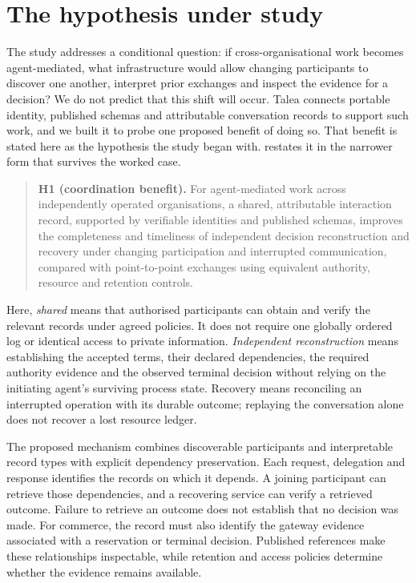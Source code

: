 \section{The hypothesis under study}
\label{sec:hypothesis}

The study addresses a conditional question: if cross-organisational work becomes agent-mediated, what infrastructure would allow changing participants to discover one another, interpret prior exchanges and inspect the evidence for a decision? We do not predict that this shift will occur. Talea connects portable identity, published schemas and attributable conversation records to support such work, and we built it to probe one proposed benefit of doing so. That benefit is stated here as the hypothesis the study began with.  restates it in the narrower form that survives the worked case.

\begin{quote}
\textbf{H1 (coordination benefit).} For agent-mediated work across independently operated organisations, a shared, attributable interaction record, supported by verifiable identities and published schemas, improves the completeness and timeliness of independent decision reconstruction and recovery under changing participation and interrupted communication, compared with point-to-point exchanges using equivalent authority, resource and retention controls.
\end{quote}

Here, \emph{shared} means that authorised participants can obtain and verify the relevant records under agreed policies. It does not require one globally ordered log or identical access to private information. \emph{Independent reconstruction} means establishing the accepted terms, their declared dependencies, the required authority evidence and the observed terminal decision without relying on the initiating agent's surviving process state. Recovery means reconciling an interrupted operation with its durable outcome; replaying the conversation alone does not recover a lost resource ledger.

The proposed mechanism combines discoverable participants and interpretable record types with explicit dependency preservation. Each request, delegation and response identifies the records on which it depends. A joining participant can retrieve those dependencies, and a recovering service can verify a retrieved outcome. Failure to retrieve an outcome does not establish that no decision was made. For commerce, the record must also identify the gateway evidence associated with a reservation or terminal decision. Published references make these relationships inspectable, while retention and access policies determine whether the evidence remains available.

